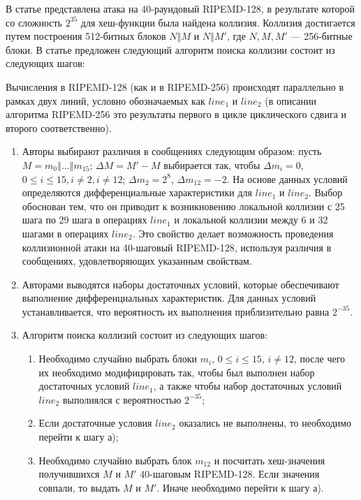 \documentclass{./civarticle}
\begin{document}
В статье \cite{ripemdat2} представлена атака на 40-раундовый RIPEMD-128, в результате которой со сложность $2^{35}$ для хеш-функции была найдена коллизия. Коллизия достигается путем построения 512-битных блоков $N \mathbin\Vert M$ и $N \mathbin\Vert M'$, где $N, M, M'$ --- 256-битные блоки. В статье предложен следующий алгоритм поиска коллизии состоит из следующих шагов:

Вычисления в RIPEMD-128 (как и в RIPEMD-256) происходят параллельно в рамках двух линий, условно обозначаемых как $line_1$ и $line_2$ (в описании алгоритма RIPEMD-256 это результаты первого в цикле циклического сдвига и второго соответственно).

\begin{enumerate}
    \item Авторы выбирают различия в сообщениях следующим образом: пусть $M = m_0 \mathbin\Vert ... \mathbin\Vert m_{15}$; $\Delta M = M' - M$ выбирается так, чтобы $\Delta m_i = 0$, $0 \leq i \leq 15, i \neq 2, i \neq 12$; $\Delta m_2 = 2^8$, $\Delta m_{12} = -2$. На основе данных условий определяются дифференциальные характеристики для $line_1$ и $line_2$. Выбор обоснован тем, что он приводит к возникновению локальной коллизии с 25 шага по 29 шага в операциях $line_1$ и локальной коллизии между 6 и 32 шагами в операциях $line_2$. Это свойство делает возможность проведения коллизионной атаки на 40-шаговый RIPEMD-128, используя различия в сообщениях, удовлетворяющих указанным свойствам.

    \item Авторами выводятся наборы достаточных условий, которые обеспечивают выполнение дифференциальных характеристик. Для данных условий устанавливается, что вероятность их выполнения приблизительно равна $2^{-35}$.

    \item Алгоритм поиска коллизий состоит из следующих шагов:

    \begin{enumerate}
        \item Необходимо случайно выбрать блоки $m_i$, $0 \leq i \leq 15$, $i \neq 12$, после чего их необходимо модифицировать так, чтобы был выполнен набор достаточных условий $line_1$, а также чтобы набор достаточных условий $line_2$ выполнялся с вероятностью $2^{-35}$;
        \item Если достаточные условия $line_2$ оказались не выполнены, то необходимо перейти к шагу а);
        \item Необходимо случайно выбрать блок $m_{12}$ и посчитать хеш-значения получившихся $M$ и $M'$ 40-шаговым RIPEMD-128. Если значения совпали, то выдать $M$ и $M'$. Иначе необходимо перейти к шагу а).
    \end{enumerate}
    
\end{enumerate}
\end{document}
